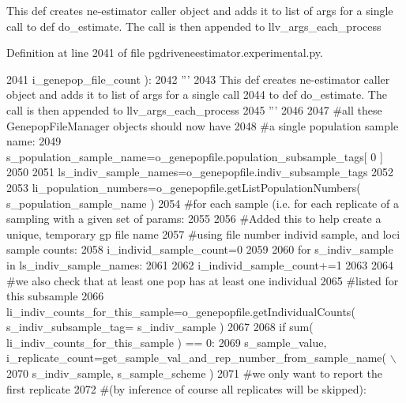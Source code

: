 \begin{DoxyVerb}This def creates ne-estimator caller object and adds it to list of args for a single call
to def do_estimate.  The call is then appended to llv_args_each_process
\end{DoxyVerb}
 

Definition at line 2041 of file pgdriveneestimator.\+experimental.\+py.


\begin{DoxyCode}
2041                                             i\_genepop\_file\_count ):
2042     \textcolor{stringliteral}{'''     }
2043 \textcolor{stringliteral}{    This def creates ne-estimator caller object and adds it to list of args for a single call}
2044 \textcolor{stringliteral}{    to def do\_estimate.  The call is then appended to llv\_args\_each\_process}
2045 \textcolor{stringliteral}{    '''}
2046 
2047     \textcolor{comment}{#all these GenepopFileManager objects should now have}
2048     \textcolor{comment}{#a single population sample name:}
2049     s\_population\_sample\_name=o\_genepopfile.population\_subsample\_tags[ 0 ]
2050 
2051     ls\_indiv\_sample\_names=o\_genepopfile.indiv\_subsample\_tags
2052 
2053     li\_population\_numbers=o\_genepopfile.getListPopulationNumbers( s\_population\_sample\_name )
2054     \textcolor{comment}{#for each sample (i.e. for each replicate of a sampling with a given set of params:}
2055 
2056     \textcolor{comment}{#Added this to help create a unique, temporary gp file name}
2057     \textcolor{comment}{#using file number individ sample, and loci sample counts:}
2058     i\_individ\_sample\_count=0
2059 
2060     \textcolor{keywordflow}{for} s\_indiv\_sample \textcolor{keywordflow}{in} ls\_indiv\_sample\_names:
2061 
2062         i\_individ\_sample\_count+=1
2063 
2064         \textcolor{comment}{#we also check that at least one pop has at least one individual}
2065         \textcolor{comment}{#listed for this subsample}
2066         li\_indiv\_counts\_for\_this\_sample=o\_genepopfile.getIndividualCounts( s\_indiv\_subsample\_tag=
      s\_indiv\_sample )
2067 
2068         \textcolor{keywordflow}{if} sum( li\_indiv\_counts\_for\_this\_sample ) == 0:
2069             s\_sample\_value, i\_replicate\_count=get\_sample\_val\_and\_rep\_number\_from\_sample\_name( \(\backslash\)
2070                                             s\_indiv\_sample, s\_sample\_scheme )
2071             \textcolor{comment}{#we only want to report the first replicate}
2072             \textcolor{comment}{#(by inference of course all replicates will be skipped):}

\end{DoxyCode}
